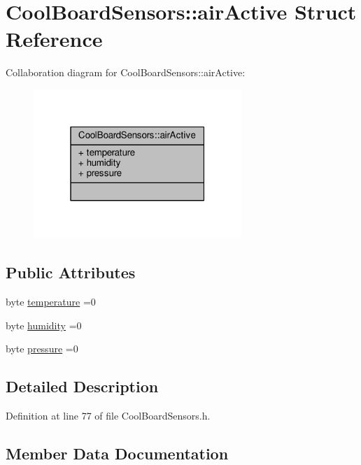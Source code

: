 \hypertarget{structCoolBoardSensors_1_1airActive}{}\section{Cool\+Board\+Sensors\+:\+:air\+Active Struct Reference}
\label{structCoolBoardSensors_1_1airActive}


Collaboration diagram for Cool\+Board\+Sensors\+:\+:air\+Active\+:\nopagebreak
\begin{figure}[H]
\begin{center}
\leavevmode
\includegraphics[width=223pt]{structCoolBoardSensors_1_1airActive__coll__graph}
\end{center}
\end{figure}
\subsection*{Public Attributes}
\begin{DoxyCompactItemize}
\item 
byte \hyperlink{structCoolBoardSensors_1_1airActive_a9a6633c426b0508e30ebc1832ec6d745}{temperature} =0
\item 
byte \hyperlink{structCoolBoardSensors_1_1airActive_ae5740445054b27415e22f450576accb7}{humidity} =0
\item 
byte \hyperlink{structCoolBoardSensors_1_1airActive_ab200826a70d1dc9945f5efb6b9c732ed}{pressure} =0
\end{DoxyCompactItemize}


\subsection{Detailed Description}


Definition at line 77 of file Cool\+Board\+Sensors.\+h.



\subsection{Member Data Documentation}
\mbox{\label{structCoolBoardSensors_1_1airActive_ae5740445054b27415e22f450576accb7}} 
